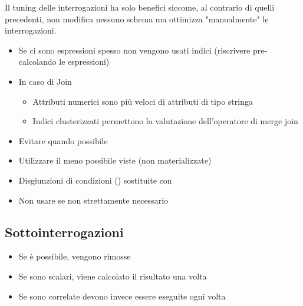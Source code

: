 Il tuning delle interrogazioni ha solo benefici siccome, al contrario di quelli precedenti, non modifica nessuno schema ma ottimizza "manualmente" le interrogazioni.
\begin{itemize}
    \item Se ci sono espressioni spesso non vengono usati indici (riscrivere pre-calcolando le espressioni)
    \item In caso di Join
    \begin{itemize}
        \item Attributi numerici sono più veloci di attributi di tipo stringa
        \item Indici clusterizzati permettono la valutazione dell'operatore di merge join
    \end{itemize}
    \item Evitare  quando possibile
    \item Utilizzare il meno possibile viste (non materializzate)
    \item Disgiunzioni di condizioni () sostituite con 
    \item Non usare  se non strettamente necessario
\end{itemize}

\subsection{Sottointerrogazioni}
\begin{itemize}
    \item Se \`e possibile, vengono rimosse
    \item Se sono scalari, viene calcolato il risultato una volta
    \item Se sono correlate devono invece essere eseguite ogni volta
\end{itemize}